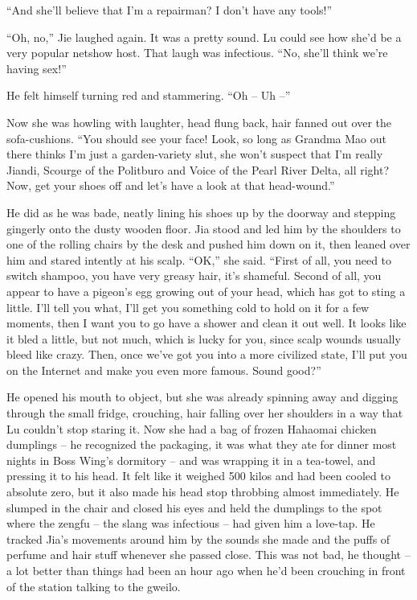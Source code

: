 ``And she'll believe that I'm a repairman? I don't have any tools!''

``Oh, no,'' Jie laughed again. It was a pretty sound. Lu could see
how she'd be a very popular netshow host. That laugh was
infectious. ``No, she'll think we're having sex!''

He felt himself turning red and stammering. ``Oh -- Uh --''

Now she was howling with laughter, head flung back, hair fanned out
over the sofa-cushions. ``You should see your face! Look, so long as
Grandma Mao out there thinks I'm just a garden-variety slut, she
won't suspect that I'm really Jiandi, Scourge of the Politburo and
Voice of the Pearl River Delta, all right? Now, get your shoes off
and let's have a look at that head-wound.''

He did as he was bade, neatly lining his shoes up by the doorway
and stepping gingerly onto the dusty wooden floor. Jia stood and
led him by the shoulders to one of the rolling chairs by the desk
and pushed him down on it, then leaned over him and stared intently
at his scalp. ``OK,'' she said. ``First of all, you need to switch
shampoo, you have very greasy hair, it's shameful. Second of all,
you appear to have a pigeon's egg growing out of your head, which
has got to sting a little. I'll tell you what, I'll get you
something cold to hold on it for a few moments, then I want you to
go have a shower and clean it out well. It looks like it bled a
little, but not much, which is lucky for you, since scalp wounds
usually bleed like crazy. Then, once we've got you into a more
civilized state, I'll put you on the Internet and make you even
more famous. Sound good?''

He opened his mouth to object, but she was already spinning away
and digging through the small fridge, crouching, hair falling over
her shoulders in a way that Lu couldn't stop staring it. Now she
had a bag of frozen Hahaomai chicken dumplings -- he recognized the
packaging, it was what they ate for dinner most nights in Boss
Wing's dormitory -- and was wrapping it in a tea-towel, and
pressing it to his head. It felt like it weighed 500 kilos and had
been cooled to absolute zero, but it also made his head stop
throbbing almost immediately. He slumped in the chair and closed
his eyes and held the dumplings to the spot where the zengfu -- the
slang was infectious -- had given him a love-tap. He tracked Jia's
movements around him by the sounds she made and the puffs of
perfume and hair stuff whenever she passed close. This was not bad,
he thought -- a lot better than things had been an hour ago when
he'd been crouching in front of the station talking to the gweilo.

